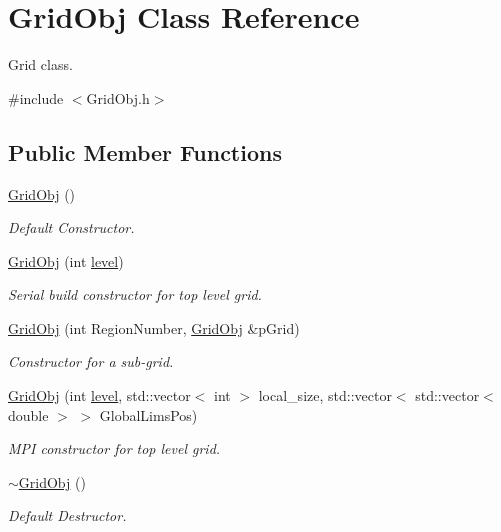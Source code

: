 \hypertarget{class_grid_obj}{}\section{Grid\+Obj Class Reference}
\label{class_grid_obj}


Grid class.  




{\ttfamily \#include $<$Grid\+Obj.\+h$>$}

\subsection*{Public Member Functions}
\begin{DoxyCompactItemize}
\item 
\hyperlink{class_grid_obj_acc3416599b59236e87b6b60a07e678af}{Grid\+Obj} ()
\begin{DoxyCompactList}\small\item\em Default Constructor. \end{DoxyCompactList}\item 
\hyperlink{class_grid_obj_aaadde3417da5f31e1b8b33635487b56e}{Grid\+Obj} (int \hyperlink{class_grid_obj_a7dfedc4442a386ec15c8b03ca899c1a9}{level})
\begin{DoxyCompactList}\small\item\em Serial build constructor for top level grid. \end{DoxyCompactList}\item 
\hyperlink{class_grid_obj_a40600a8b8a286b8299bca8265b62f51b}{Grid\+Obj} (int Region\+Number, \hyperlink{class_grid_obj}{Grid\+Obj} \&p\+Grid)
\begin{DoxyCompactList}\small\item\em Constructor for a sub-\/grid. \end{DoxyCompactList}\item 
\hyperlink{class_grid_obj_a9ea61d35cb51f7f7f454da9e9b5b0bac}{Grid\+Obj} (int \hyperlink{class_grid_obj_a7dfedc4442a386ec15c8b03ca899c1a9}{level}, std\+::vector$<$ int $>$ local\+\_\+size, std\+::vector$<$ std\+::vector$<$ double $>$ $>$ Global\+Lims\+Pos)
\begin{DoxyCompactList}\small\item\em M\+PI constructor for top level grid. \end{DoxyCompactList}\item 
\hyperlink{class_grid_obj_ace563099d85c330ac48f35b515422522}{$\sim$\+Grid\+Obj} ()
\begin{DoxyCompactList}\small\item\em Default Destructor. \end{DoxyCompactList}\item 

\end{DoxyCompactItemize}
